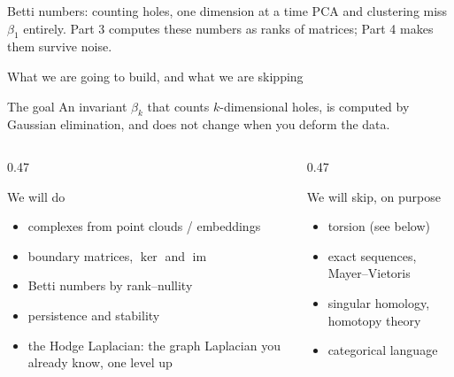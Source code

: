 \documentclass[10pt,aspectratio=169]{beamer}
\newcommand{\im}{\operatorname{im}}
\begin{document}
\begin{frame}{Betti numbers: counting holes, one dimension at a time}
        \vspace{0.3em}
        \centering\small PCA and clustering miss \alert{$\beta_1$} entirely. Part 3 computes these
        numbers as ranks of matrices; Part 4 makes them survive noise.
    \end{frame}

    \begin{frame}[shrink=15]{What we are going to build, and what we are skipping}
        \begin{block}{The goal}
            An invariant $\beta_k$ that counts $k$-dimensional holes, is computed by
            \alert{Gaussian elimination}, and does not change when you deform the data.
        \end{block}

        \vspace{0.4em}
        \begin{columns}[T,onlytextwidth]
            \begin{column}{0.47\textwidth}
                \begin{block}{We will do}
                    \scriptsize
                    \begin{itemize}
                        \item complexes from point clouds / embeddings
                        \item boundary matrices, $\ker$ and $\im$
                        \item Betti numbers by rank--nullity
                        \item persistence and stability
                        \item the Hodge Laplacian: the graph
                        Laplacian you already know, one level up
                    \end{itemize}
                \end{block}
            \end{column}
            \begin{column}{0.47\textwidth}
                \begin{block}{We will skip, on purpose}
                    \scriptsize
                    \begin{itemize}
                        \item torsion (see below)
                        \item exact sequences, Mayer--Vietoris
                        \item singular homology, homotopy theory
                        \item categorical language
                    \end{itemize}
                \end{block}
            \end{column}
        \end{columns}


\end{frame}
\end{document}
